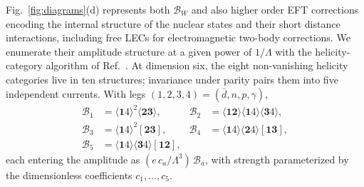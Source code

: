 \documentclass[
  aps,prd,twocolumn,nofootinbib,superscriptaddress,
  longbibliography,floatfix,preprintnumbers
]{revtex4-2}
\newcommand{\ad}[2]{\langle #1 #2\rangle}
\newcommand{\sq}[2]{[#1 #2]}
\begin{document}
Fig.~\ref{fig:diagrams}(d) represents both $\mathcal{B}_W$ and also higher order EFT corrections encoding the internal structure of the nuclear states and their short
distance interactions, including free LECs for electromagnetic two-body corrections.
We enumerate their amplitude structure at a given power of $1/ \Lambda$ with the helicity-category algorithm of
Ref.~\cite{DeAngelis:2022qco}.  At dimension six, the eight
non-vanishing helicity categories live in ten structures; invariance under
parity pairs them into five independent currents. With legs
$(1,2,3,4)=(\bar d,n,p,\gamma)$,
\begin{align}
  \mathcal{B}_{1} &= \ad{\bm{1}}{4}^{2}\ad{\bm{2}}{\bm{3}}, &
  \mathcal{B}_{2} &= \ad{\bm{1}}{\bm{2}}\ad{\bm{1}}{4}\ad{\bm{3}}{4}, \nonumber\\
  \mathcal{B}_{3} &= \ad{\bm{1}}{4}^{2}\sq{\bm{2}}{\bm{3}}, &
  \mathcal{B}_{4} &= \ad{\bm{1}}{4}\ad{\bm{2}}{4}\sq{\bm{1}}{\bm{3}}, \nonumber\\
  \mathcal{B}_{5} &= \ad{\bm{1}}{4}\ad{\bm{3}}{4}\sq{\bm{1}}{\bm{2}}, &&
  \label{eq:dw7basis}
\end{align}
each entering the amplitude as $(e\,c_{a} /\Lambda^{3})\,\mathcal{B}_{a}$, with strength parameterized by the dimensionless coefficients $c_{1},\dots,c_{5}$.
\end{document}
